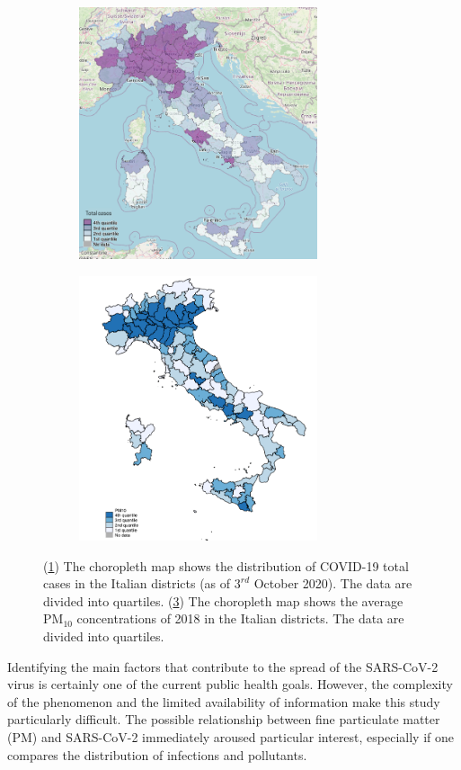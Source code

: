 \documentclass[review]{elsarticle}
\begin{document}
\begin{figure}[h]
\begin{subfigure}{.5\textwidth}
	\centering
	\includegraphics[width=7cm]{total_cases}
	\caption{}
	\label{fig:total_cases}
\end{subfigure}
\begin{subfigure}{.49\textwidth}
	\centering
	\includegraphics[width=7cm]{PM10_italia}
	\caption{}
	\label{fig:PM10_italia}
\end{subfigure}
\caption{(\ref{fig:total_cases}) The choropleth map shows the distribution of COVID-19 total cases in the Italian districts (as of $3^{rd}$ October 2020). The data are divided into quartiles. (\ref{fig:PM10_italia}) The choropleth map shows the average PM$_{10}$ concentrations of 2018 in the Italian districts. The data are divided into quartiles. \cite{becchetti2020understanding}}
\end{figure}

Identifying the main factors that contribute to the spread of the SARS-CoV-2 virus is certainly one of the current public health goals. However, the complexity of the phenomenon and the limited availability of information make this study particularly difficult. The possible relationship between fine particulate matter (PM) and SARS-CoV-2 immediately aroused particular interest, especially if one compares the distribution of infections and pollutants. 
\end{document}
